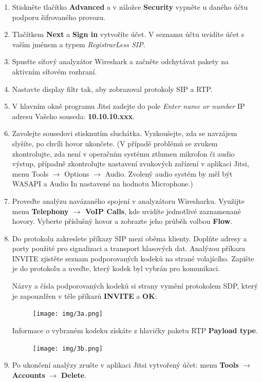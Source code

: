 \begin{enumerate}
    \item Stiskněte tlačítko {\bf Advanced} a v záložce {\bf Security} vypněte u daného účtu podporu šifrovaného provozu.
    \item Tlačítkem {\bf Next} a {\bf Sign in} vytvoříte účet. V seznamu účtu uvidíte účet s vaším jménem a typem {\it RegistrarLess SIP}.
    \item Spusťte síťový analyzátor Wireshark a začněte odchytávat pakety na aktivním síťovém rozhraní.
    \item Nastavte display filtr tak, aby zobrazoval protokoly SIP a RTP.
    \item V hlavním okně programu Jitsi zadejte do pole {\it Enter name or number} IP adresu Vašeho souseda: {\bf 10.10.10.xxx}.
    \item Zavolejte sousedovi stisknutím sluchátka. Vyzkoušejte, zda se navzájem slyšíte, po chvíli hovor ukončete.
      (V případě problémů se zvukem zkontrolujte, zda není v operačním systému ztlumen mikrofon či audio výstup, případně zkontrolujte nastavení zvukových zařízení v aplikaci Jitsi, menu Tools $\rightarrow$ Options $\rightarrow$ Audio. Zvolený audio systém by měl být WASAPI a Audio In nastavené na hodnotu Microphone.) 
    \item Proveďte analýzu navázaného spojení v analyzátoru Wiresharku. Využijte menu {\bf Telephony $\rightarrow$ VoIP Calls}, kde uvidíte jednotlivé zaznamenané hovory. Vyberte příslušný hovor a zobrazte jeho průběh volbou {\bf Flow}.
    \item Do protokolu zakreslete příkazy SIP mezi oběma klienty. Doplňte adresy a porty použité pro signalizaci a transport hlasových dat. Analýzou příkazu INVITE zjistěte seznam podporovaných kodeků na strané volajícího. Zapište je do protokolu a uveďte, který kodek byl vybrán pro komunikaci. 


      Názvy a čísla podporovaných kodeků si strany vymění protokolem SDP, který je zapouzdřen v těle příkazů {\bf INVITE} a {\bf OK}:
\begin{figure}[h!]
  \centering
  \texttt{[image: img/3a.png]}
\end{figure}

\noindent Informace o vybraném kodeku získáte z hlavičky paketu RTP {\bf Payload type}.
\begin{figure}[h!]
  \centering
  \texttt{[image: img/3b.png]}
\end{figure}

  \item Po ukončení analýzy zrušte v aplikaci Jitsi vytvořený účet: menu {\bf Tools} $\rightarrow$ {\bf Accounts} $\rightarrow$ {\bf Delete}. 
\end{enumerate}


